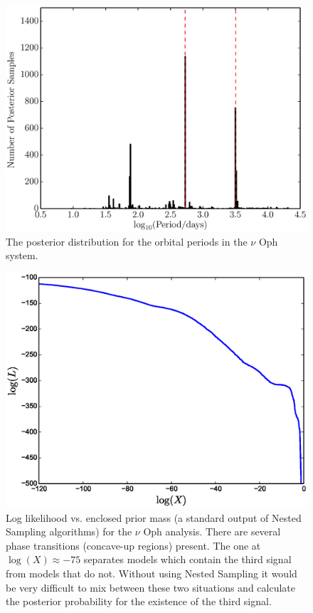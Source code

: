 \documentclass[useAMS,usenatbib]{mn2e}
\begin{document}
\begin{figure}
\includegraphics[scale=0.45]{Figures/nu_oph_periods.eps}
\caption{The posterior distribution for the orbital periods in the $\nu$ Oph
system.\label{fig:nu_oph_periods}}
\end{figure}

\begin{figure}
\includegraphics[scale=0.45]{Figures/logl0.eps}
\caption{Log likelihood vs. enclosed prior mass (a standard output of Nested
Sampling algorithms) for the $\nu$ Oph analysis.
There are several phase transitions (concave-up regions) present. The one at
$\log(X) \approx -75$ separates models which contain the third signal from
models that do not. Without using Nested Sampling it would be very difficult
to mix between these two situations and calculate the posterior probability
for the existence of the third signal.
\label{fig:logl0}}
\end{figure}
\end{document}
